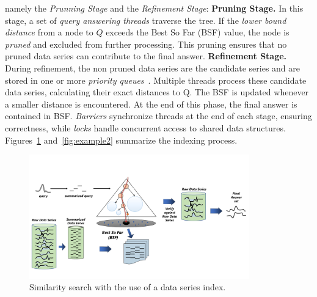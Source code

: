 namely the \textit{Prunning Stage} and the \textit{Refinement Stage}:
\newline\noindent\textbf{Pruning Stage.} In this stage, a set of \textit{query answering threads}
traverse the tree. If the \textit{lower bound distance} from a node to $Q$
exceeds the Best So Far (BSF) value, the node is \textit{pruned} and excluded from
further processing. This pruning ensures that no pruned data series can contribute
to the final answer.
\newline\noindent\textbf{Refinement Stage.} During refinement, the non pruned data series 
are the candidate series and are stored in one or more \textit{priority queues}~\cite{parisplus,PFP21-I,PFP21-II}.
Multiple threads process these candidate data series, calculating their exact
distances to Q. The BSF is updated whenever a smaller distance is encountered.
\newline At the end of this phase, the final answer is contained in BSF.  
\textit{Barriers} synchronize threads at the end of each stage, ensuring correctness,  
while \textit{locks} handle concurrent access to shared data structures.  
Figures~\ref{fig:example} and~\ref{fig:example2} summarize the indexing process.  

\begin{figure}[htbp]
    \centering
    \includegraphics[width=0.85\textwidth]{figures/prelem/iSAX-index.pdf}
    \caption{Similarity search with the use of a data series index.}
    \label{fig:example}
    \vspace{-0.5cm} %
\end{figure}

